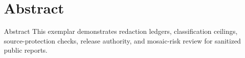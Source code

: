 \documentclass[
  ignorenonframetext,
]{beamer}
\author{\texorpdfstring{}{}}
\date{}
\begin{document}
\section{Abstract}\label{abstract}

\begin{frame}[allowframebreaks]{Abstract}
This exemplar demonstrates redaction ledgers, classification ceilings,
source-protection checks, release authority, and mosaic-risk review for
sanitized public reports.
\end{frame}
\end{document}
